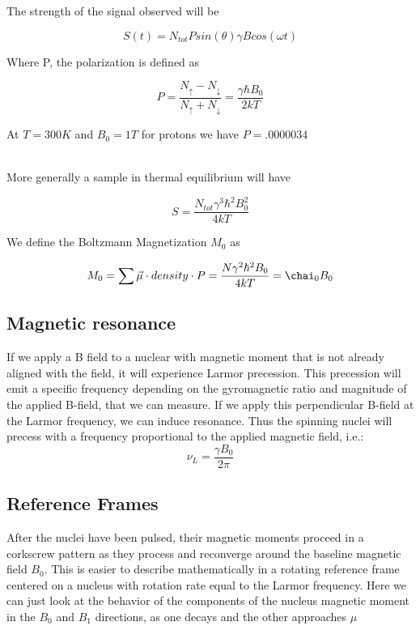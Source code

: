 \documentclass[12pt]{article}
\begin{document}
The strength of the signal observed will be

\[S(t) = N_{tot}Psin(\theta)\gamma B cos(\omega t)\]

Where P, the polarization is defined as

\[P = \frac{N_{\uparrow} - N_{\downarrow}}{N_{\uparrow} + N_{\downarrow}} = \frac{\gamma \hbar B_0}{2kT}\]


At $T= 300K$ and $B_0 = 1T$ for protons we have $P = .0000034$ \cite{pirl_youtube_mri}
\\\

More generally a sample in thermal equilibrium will have

\[S = \frac{N_{tot}\gamma^3\hbar^2B_0^2}{4kT}\]


We define the Boltzmann Magnetization $M_0$ as

\[M_0 = \sum \vec{\mu} \cdot density \cdot P = \frac{N\gamma^2\hbar^2B_0}{4kT} = \chai_0 B_0\]

\subsection { Magnetic resonance
}

If we apply a B field to a nuclear with magnetic moment that is not already aligned with the field, it will experience Larmor precession. This precession will emit a specific frequency depending on the gyromagnetic ratio and magnitude of the applied B-field, that we can measure. If we apply this perpendicular B-field at the Larmor frequency, we can induce resonance.
Thus the spinning nuclei will precess with a frequency proportional to the applied magnetic field, i.e.:
\[\nu_L = \frac{\gamma B_0}{2\pi}\]

\subsection { Reference Frames
}

After the nuclei have been pulsed, their magnetic moments proceed in a corkscrew pattern as they process and reconverge around the baseline magnetic field $B_0$. This is easier to describe mathematically in a rotating reference frame centered on a nucleus with rotation rate equal to the Larmor frequency. Here we can just look at the behavior of the components of the nucleus magnetic moment in the $B_0$ and $B_1$ directions, as one decays and the other approaches $\mu$
\end{document}

